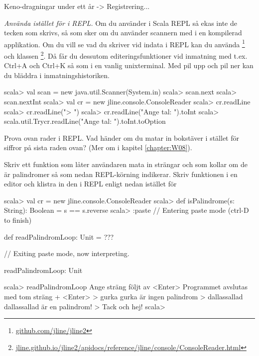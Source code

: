 \Task Keno-dragningar under ett år -> Registrering...

\Task \emph{Använda  istället för  i REPL.} Om du använder   i Scala REPL så ekas inte de tecken som skrivs, så som sker om du använder scannern med  i en kompilerad applikation. Om du vill se vad du skriver vid indata i REPL kan du använda \footnote{
\href{https://github.com/jline/jline2}{github.com/jline/jline2}
} och klassen \footnote{
\href{http://jline.github.io/jline2/apidocs/reference/jline/console/ConsoleReader.html}{jline.github.io/jline2/apidocs/reference/jline/console/ConsoleReader.html}}. 
Då får du dessutom editeringsfunktioner vid inmatning med t.ex. Ctrl+A och Ctrl+K så som i en vanlig unixterminal. Med pil upp och pil ner kan du bläddra i inmatningshistoriken.
\begin{REPL}
scala> val scan = new java.util.Scanner(System.in)
scala> scan.next
scala> scan.nextInt
scala> val cr = new jline.console.ConsoleReader
scala> cr.readLine
scala> cr.readLine("> ")
scala> cr.readLine("Ange tal: ").toInt
scala> scala.util.Try{cr.readLine("Ange tal: ").toInt}.toOption
\end{REPL} 

\Subtask Prova ovan rader i REPL. Vad händer om du matar in bokstäver i stället för siffror på sista raden ovan? (Mer om  i kapitel \ref{chapter:W08}).

\Subtask Skriv ett funktion  som låter användaren mata in strängar och som kollar om de är palindromer så som nedan REPL-körning indikerar. Skriv funktionen i en editor och klistra in den i REPL enligt nedan istället för 

\begin{REPL}
scala> val cr = new jline.console.ConsoleReader
scala> def isPalindrome(s: String): Boolean = s == s.reverse
scala> :paste 
// Entering paste mode (ctrl-D to finish)

def readPalindromLoop: Unit = ???

// Exiting paste mode, now interpreting.

readPalindromLoop: Unit

scala> readPalindromLoop
Ange sträng följt av <Enter>
Programmet avslutas med tom sträng + <Enter>
> gurka
gurka är ingen palindrom
> dallassallad
dallassallad är en palindrom!
> 
Tack och hej!
scala>
\end{REPL}

